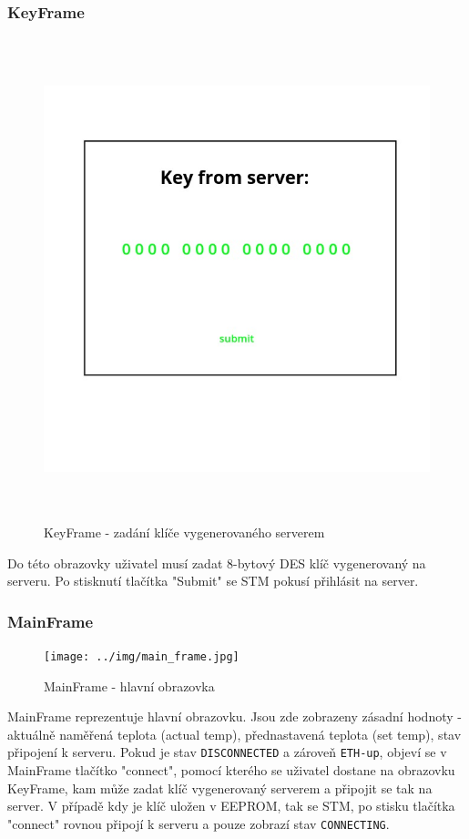 \subsubsection{KeyFrame}
\begin{figure}[p]\centering
\includegraphics[width=140mm, height=140mm]{../img/key_frame.jpg}
\caption{KeyFrame - zadání klíče vygenerovaného serverem}
\label{key-frame}
\end{figure}

Do této obrazovky uživatel musí zadat 8-bytový DES klíč vygenerovaný na serveru.
Po stisknutí tlačítka "Submit" se STM pokusí přihlásit na server.

\subsubsection{MainFrame}
\begin{figure}[p]\centering
\texttt{[image: ../img/main\_frame.jpg]}
\caption{MainFrame - hlavní obrazovka}
\label{main-frame}
\end{figure}

MainFrame reprezentuje hlavní obrazovku.
Jsou zde zobrazeny zásadní hodnoty - aktuálně naměřená teplota (actual temp), přednastavená teplota
(set temp), stav připojení k serveru.
Pokud je stav \texttt{DISCONNECTED} a zároveň \texttt{ETH-up}, objeví se v MainFrame tlačítko "connect",
pomocí kterého se uživatel dostane na obrazovku KeyFrame, kam může zadat klíč vygenerovaný serverem a
připojit se tak na server.
V případě kdy je klíč uložen v EEPROM, tak se STM, po stisku tlačítka "connect" rovnou připojí k serveru
a pouze zobrazí stav \texttt{CONNECTING}.

